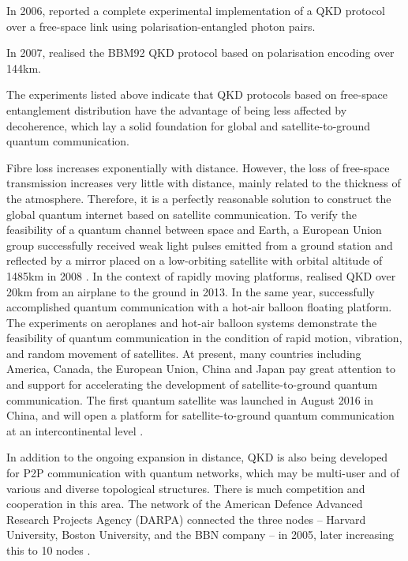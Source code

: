 \documentclass[aps,rmp,twocolumn,amsmath,amssymb,nofootinbib,superscriptaddress,longbibliography,floatfix,table-of-contents,eqsecnum]{revtex4-1}
\newcommand{\comment}[1]{{\color{blue}{\textbf{#1}}}}
\begin{document}
In 2006, \cite{bib:APL_89_101122} reported a complete experimental implementation of a QKD protocol over a free-space link using polarisation-entangled photon pairs.

In 2007, \cite{bib:NP_3_481} realised the BBM92 QKD protocol based on polarisation encoding over 144km.

The experiments listed above indicate that QKD protocols based on free-space entanglement distribution have the advantage of being less affected by decoherence, which lay a solid foundation for global and satellite-to-ground quantum communication.

\comment{Up to here}

Fibre loss increases exponentially with distance. However, the loss of free-space transmission increases very little with distance,  mainly related to the thickness of the atmosphere. Therefore, it is a perfectly reasonable solution to construct the global quantum internet based on satellite communication. To verify the feasibility of a quantum channel between space and Earth, a European Union group successfully received weak light pulses emitted from a ground station and reflected by a mirror placed on a low-orbiting satellite with orbital altitude of 1485km in 2008 \cite{bib:NJP_10_033038}. In the context of rapidly moving platforms, \cite{bib:NP_7_382} realised QKD over 20km from an airplane to the ground in 2013. In the same year, \cite{bib:NP_7_387} successfully accomplished quantum communication with a hot-air balloon floating platform. The experiments on aeroplanes and hot-air balloon systems demonstrate the feasibility of quantum communication in the condition of rapid motion, vibration, and random movement of satellites. At present, many countries including America, Canada, the European Union, China and Japan pay great attention to and support for accelerating the development of satellite-to-ground quantum communication. The first quantum satellite was launched in August 2016 in China, and will open a platform for satellite-to-ground quantum communication at an intercontinental level \cite{bib:N_535_478}.

In addition to the ongoing expansion in distance, QKD is also being developed for P2P communication with quantum networks, which may be multi-user and of various and diverse topological structures. There is much competition and cooperation in this area. The network of the American Defence Advanced Research Projects Agency (DARPA) connected the three nodes -- Harvard University, Boston University, and the BBN company -- in 2005, later increasing this to 10 nodes \cite{bib:QCC_2006_83}.
\end{document}
